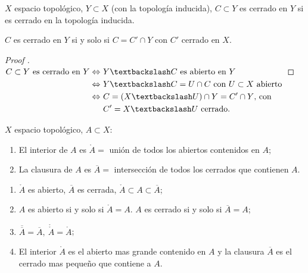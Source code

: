 	\begin{definition}
		$X$ espacio topológico, $Y \subset X$ (con la topología inducida), $C \subset Y$ es cerrado en $Y$ si es cerrado en la topología inducida.
	\end{definition}

	\begin{lemma}
		$C$ es cerrado en $Y$ si y solo si $C = C' \cap Y$ con $C'$ cerrado en $X$.
	\end{lemma}

	\begin{proof}[Proof ]
		$\begin{aligned}[t]
			C \subset Y \text{ es cerrado en } Y \iff \ & Y \textbackslash C \text{ es abierto en } Y \\
			\iff \ & Y \textbackslash C = U \cap C \text{ con } U \subset X \text{ abierto} \\
			\iff \ & C = (X \textbackslash U) \cap Y = C' \cap Y \text{, con } \\
			& C' = X \textbackslash U \text{ cerrado}
		.\end{aligned}$
	\end{proof}

	\begin{definition}
		$X$ espacio topológico, $A \subset X$:
		\begin{enumerate}
			\item El interior de $A$ es $\mathring{A} =$ unión de todos los abiertos contenidos en $A$;

			\item La clausura de $A$ es $\overline{A} =$ intersección de todos los cerrados que contienen $A$.
		\end{enumerate}
	\end{definition}

	\begin{remark}
		\text{ }
		\begin{enumerate}
			\item $\mathring{A}$ es abierto, $\overline{A}$ es cerrada, $\mathring{A} \subset A \subset \overline{A}$;

			\item $A$ es abierto si y solo si $\mathring{A} = A$. $A$ es cerrado si y solo si $\overline{A} = A$;

			\item $\overline{\overline{A}} = \overline{A}, \ \mathring{\mathring{A}} = \mathring{A}$;

			\item El interior $\mathring{A}$ es el abierto mas grande contenido en $A$ y la clausura $\overline{A}$ es el cerrado mas pequeño que contiene a $A$.
		\end{enumerate}
	\end{remark}

